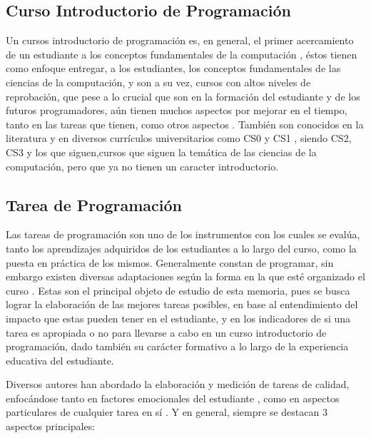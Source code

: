 \documentclass[letterpaper,12pt]{article}
\begin{document}
\subsection{Curso Introductorio de Programación}

Un cursos introductorio de programación es, en general, el primer acercamiento de un estudiante a los conceptos fundamentales de la computación \cite{10.7717/peerj-cs.647}, éstos tienen como enfoque entregar, a los estudiantes, los conceptos fundamentales de las ciencias de la computación, y son a su vez, cursos con altos niveles de reprobación, que pese a lo crucial que son en la formación del estudiante y de los futuros programadores, aún tienen muchos aspectos por mejorar en el tiempo, tanto en las tareas que tienen, como otros aspectos \cite{10.1145/2591708.2591749}. También son conocidos en la literatura y en diversos currículos universitarios como CS0 \cite{cs0} y CS1 \cite{cs1}, siendo CS2, CS3 y los que siguen,cursos que siguen la temática de las ciencias de la computación, pero que ya no tienen un caracter introductorio.

\subsection{Tarea de Programación}

Las tareas de programación son uno de los instrumentos con los cuales se evalúa, tanto los aprendizajes adquiridos de los estudiantes a lo largo del curso, como la puesta en práctica de los mismos. Generalmente constan de programar, sin embargo existen diversas adaptaciones según la forma en la que esté organizado el curso \cite{cs1}. Estas son el principal objeto de estudio de esta memoria, pues se busca lograr la elaboración de las mejores tareas posibles, en base al entendimiento del impacto que estas pueden tener en el estudiante, y en los indicadores de si una tarea es apropiada o no para llevarse a cabo en un curso introductorio de programación, dado también su carácter formativo a lo largo de la experiencia educativa del estudiante.

Diversos autores han abordado la elaboración y medición de tareas de calidad, enfocándose tanto en factores emocionales del estudiante \cite{10.1145/1839594.1839609, 10.1145/1227504.1227466, 10.5555/1968521.1968545, 10.1145/2526968.2526982}, como en aspectos particulares de cualquier tarea en sí \cite{texasU, 10.1145/2676723.2677276, 10.1145/1140124.1140167}. Y en general, siempre se destacan 3 aspectos principales:
\end{document}
